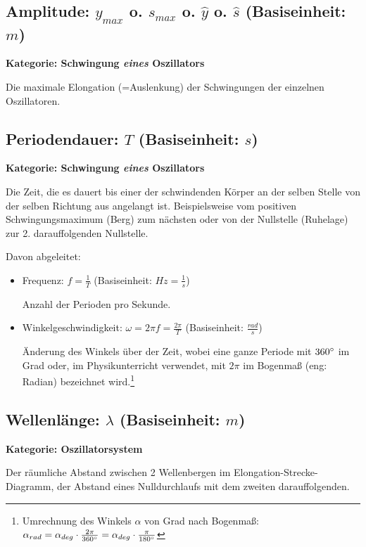 \subsection[Amplitude]{Amplitude: $y_{max}$ o. $s_{max}$ o. $\hat{y}$ o. $\hat{s}$ (Basiseinheit: $m$)}

\textbf{Kategorie: Schwingung \textit{eines} Oszillators}

Die maximale Elongation (=\glqq Auslenkung\grqq) der Schwingungen der einzelnen Oszillatoren.



\subsection[Periodendauer]{Periodendauer: $T$ (Basiseinheit: $s$)}

\textbf{Kategorie: Schwingung \textit{eines} Oszillators}
	
Die Zeit, die es dauert bis einer der schwindenden Körper an der selben Stelle von der selben Richtung aus angelangt ist. Beispielsweise vom positiven Schwingungsmaximum (\glqq Berg\grqq) zum nächsten oder von der Nullstelle (\glqq Ruhelage\grqq) zur 2. darauffolgenden Nullstelle.

Davon abgeleitet:
\begin{itemize}
	\item Frequenz: $f=\frac{1}{T}$ (Basiseinheit: $Hz=\frac{1}{s}$)
	
	Anzahl der Perioden pro Sekunde.
	\item Winkelgeschwindigkeit: $\omega=2 \pi f=\frac{2 \pi}{T}$ (Basiseinheit: $\frac{rad}{s}$)
		
	Änderung des Winkels über der Zeit, wobei eine ganze Periode mit $360 \degree$ im Grad oder, im Physikunterricht verwendet, mit $2 \pi$ im Bogenmaß (eng: \glqq Radian\grqq) bezeichnet wird.\footnote{Umrechnung des Winkels $\alpha$ von Grad nach Bogenmaß: $\alpha_{rad} = \alpha_{deg} \cdot \frac{2\pi}{360 \degree} = \alpha_{deg} \cdot \frac{\pi}{180 \degree} $}
\end{itemize}



\subsection[Wellenlänge]{Wellenlänge: $\lambda$ (Basiseinheit: $m$)}

\textbf{Kategorie: Oszillatorsystem}

Der räumliche Abstand zwischen 2 Wellenbergen im Elongation-Strecke-Diagramm, der Abstand eines Nulldurchlaufs mit dem zweiten darauffolgenden.



